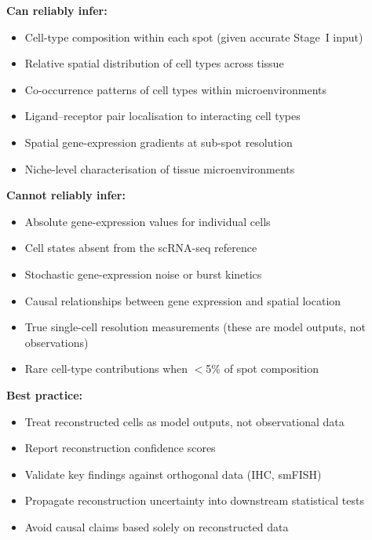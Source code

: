 \begin{tcolorbox}[title=Box 1: What pseudo single-cell reconstruction can and cannot reliably infer]

\textbf{Can reliably infer:}
\begin{itemize}
  \item Cell-type composition within each spot (given accurate Stage~I input)
  \item Relative spatial distribution of cell types across tissue
  \item Co-occurrence patterns of cell types within microenvironments
  \item Ligand--receptor pair localisation to interacting cell types
  \item Spatial gene-expression gradients at sub-spot resolution
  \item Niche-level characterisation of tissue microenvironments
\end{itemize}

\textbf{Cannot reliably infer:}
\begin{itemize}
  \item Absolute gene-expression values for individual cells
  \item Cell states absent from the scRNA-seq reference
  \item Stochastic gene-expression noise or burst kinetics
  \item Causal relationships between gene expression and spatial location
  \item True single-cell resolution measurements (these are model outputs, not observations)
  \item Rare cell-type contributions when $<$5\% of spot composition
\end{itemize}

\textbf{Best practice:}
\begin{itemize}
  \item Treat reconstructed cells as model outputs, not observational data
  \item Report reconstruction confidence scores
  \item Validate key findings against orthogonal data (IHC, smFISH)
  \item Propagate reconstruction uncertainty into downstream statistical tests
  \item Avoid causal claims based solely on reconstructed data
\end{itemize}

\end{tcolorbox}
